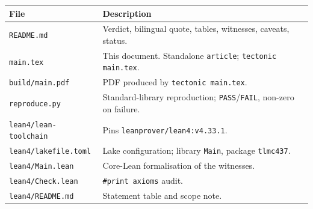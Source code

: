\documentclass[11pt]{article}
\theoremstyle{definition}
\theoremstyle{remark}
\begin{document}
\begin{center}
\begin{tabular}{l l}
\toprule
File & Description \\
\midrule
\texttt{README.md} & Verdict, bilingual quote, tables, witnesses, caveats, status. \\
\texttt{main.tex} & This document. Standalone \texttt{article}; \texttt{tectonic main.tex}. \\
\texttt{build/main.pdf} & PDF produced by \texttt{tectonic main.tex}. \\
\texttt{reproduce.py} & Standard-library reproduction; \texttt{PASS}/\texttt{FAIL}, non-zero on failure. \\
\texttt{lean4/lean-toolchain} & Pins \texttt{leanprover/lean4:v4.33.1}. \\
\texttt{lean4/lakefile.toml} & Lake configuration; library \texttt{Main}, package \texttt{tlmc437}. \\
\texttt{lean4/Main.lean} & Core-Lean formalisation of the witnesses. \\
\texttt{lean4/Check.lean} & \texttt{\#print axioms} audit. \\
\texttt{lean4/README.md} & Statement table and scope note. \\
\bottomrule
\end{tabular}
\end{center}
\end{document}
